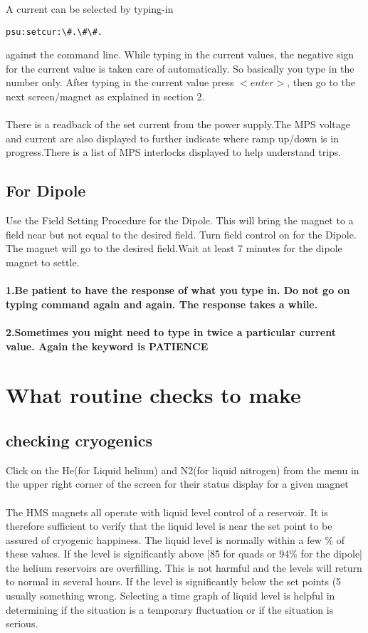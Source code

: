 \documentclass[12pt,epsf,here]{article}
\begin{document}
A current can be selected by typing-in 
\begin{verbatim}psu:setcur:\#.\#\#. \end{verbatim} 
against the command line. While typing in the current values, 
the negative sign for the current value is taken care of automatically. 
So basically you type in the number only. 
After typing in the current value press $<enter>$, 
then go to the next screen/magnet as explained in section 2.\\
\\
There is a readback of the set current from the power supply.The MPS
voltage and current are also displayed to further indicate where ramp   
up/down is in progress.There is a list of MPS interlocks displayed to help
understand trips.\\

\subsection{For Dipole}
Use the Field Setting Procedure for the Dipole. This will bring the
magnet to a field near but not equal to the desired field.   
Turn field control on for the Dipole. The magnet will go to the
desired field.Wait at least 7 minutes for the dipole magnet to settle.\\
\\
\textbf{1.Be patient to have the response of what you type in. Do not go
on typing command again and again. The response takes a while.}\\
\\
\textbf{2.Sometimes you might need to type in twice a particular current
value. Again the keyword is PATIENCE}\\



\section{What routine checks to make}
\subsection{checking cryogenics}
Click on the He(for Liquid helium) and N2(for liquid nitrogen) from the   
menu in the upper right corner of the screen for their status display for
a given magnet\\
\\
The HMS magnets all operate with liquid level control of a reservoir. It
is therefore sufficient to verify that the liquid level is near the set  
point to be assured of cryogenic happiness.  The liquid level is normally
within a few \% of these values. If the level is significantly above [85%
for quads or 94\% for the dipole] the helium reservoirs are overfilling.  
This is not harmful and the levels will return to normal in several hours.
If the level is significantly below the set points (5%
usually something wrong.  Selecting a time graph of liquid level is
helpful in determining if the situation is a temporary fluctuation or if
the situation is serious.
\end{document}
